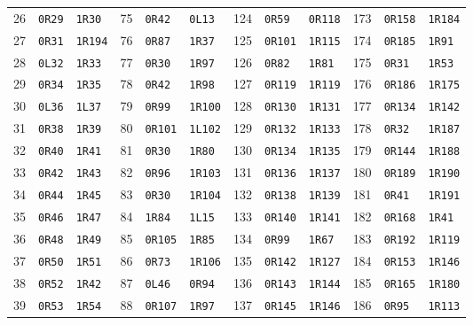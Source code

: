 \begin{center}
\begin{tabular}{@{}rll@{\qquad}rll@{\qquad}rll@{\qquad}rll@{}}
26 & \texttt{0R29} & \texttt{1R30} & 75 & \texttt{0R42} & \texttt{0L13} & 124 & \texttt{0R59} & \texttt{0R118} & 173 & \texttt{0R158} & \texttt{1R184}\\
27 & \texttt{0R31} & \texttt{1R194} & 76 & \texttt{0R87} & \texttt{1R37} & 125 & \texttt{0R101} & \texttt{1R115} & 174 & \texttt{0R185} & \texttt{1R91}\\
28 & \texttt{0L32} & \texttt{1R33} & 77 & \texttt{0R30} & \texttt{1R97} & 126 & \texttt{0R82} & \texttt{1R81} & 175 & \texttt{0R31} & \texttt{1R53}\\
29 & \texttt{0R34} & \texttt{1R35} & 78 & \texttt{0R42} & \texttt{1R98} & 127 & \texttt{0R119} & \texttt{1R119} & 176 & \texttt{0R186} & \texttt{1R175}\\
30 & \texttt{0L36} & \texttt{1L37} & 79 & \texttt{0R99} & \texttt{1R100} & 128 & \texttt{0R130} & \texttt{1R131} & 177 & \texttt{0R134} & \texttt{1R142}\\
31 & \texttt{0R38} & \texttt{1R39} & 80 & \texttt{0R101} & \texttt{1L102} & 129 & \texttt{0R132} & \texttt{1R133} & 178 & \texttt{0R32} & \texttt{1R187}\\
32 & \texttt{0R40} & \texttt{1R41} & 81 & \texttt{0R30} & \texttt{1R80} & 130 & \texttt{0R134} & \texttt{1R135} & 179 & \texttt{0R144} & \texttt{1R188}\\
33 & \texttt{0R42} & \texttt{1R43} & 82 & \texttt{0R96} & \texttt{1R103} & 131 & \texttt{0R136} & \texttt{1R137} & 180 & \texttt{0R189} & \texttt{1R190}\\
34 & \texttt{0R44} & \texttt{1R45} & 83 & \texttt{0R30} & \texttt{1R104} & 132 & \texttt{0R138} & \texttt{1R139} & 181 & \texttt{0R41} & \texttt{1R191}\\
35 & \texttt{0R46} & \texttt{1R47} & 84 & \texttt{1R84} & \texttt{1L15} & 133 & \texttt{0R140} & \texttt{1R141} & 182 & \texttt{0R168} & \texttt{1R41}\\
36 & \texttt{0R48} & \texttt{1R49} & 85 & \texttt{0R105} & \texttt{1R85} & 134 & \texttt{0R99} & \texttt{1R67} & 183 & \texttt{0R192} & \texttt{1R119}\\
37 & \texttt{0R50} & \texttt{1R51} & 86 & \texttt{0R73} & \texttt{1R106} & 135 & \texttt{0R142} & \texttt{1R127} & 184 & \texttt{0R153} & \texttt{1R146}\\
38 & \texttt{0R52} & \texttt{1R42} & 87 & \texttt{0L46} & \texttt{0R94} & 136 & \texttt{0R143} & \texttt{1R144} & 185 & \texttt{0R165} & \texttt{1R180}\\
39 & \texttt{0R53} & \texttt{1R54} & 88 & \texttt{0R107} & \texttt{1R97} & 137 & \texttt{0R145} & \texttt{1R146} & 186 & \texttt{0R95} & \texttt{1R113}\\

\end{tabular}
\end{center}
